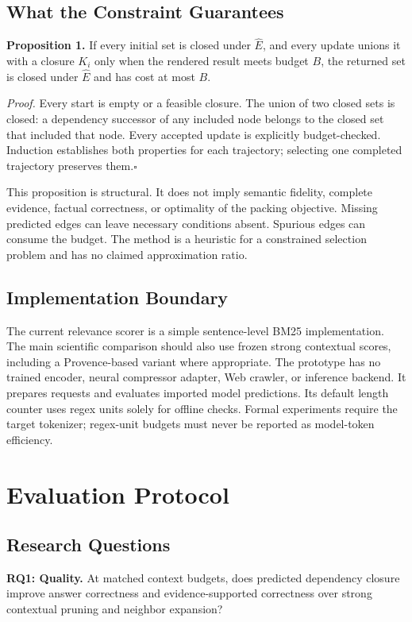 \documentclass[10pt,twocolumn]{article}
\begin{document}
\subsection{What the Constraint Guarantees}
\noindent\textbf{Proposition 1.} If every initial set is closed under $\widehat E$, and every update unions it with a closure $K_i$ only when the rendered result meets budget $B$, the returned set is closed under $\widehat E$ and has cost at most $B$.

\noindent\emph{Proof.} Every start is empty or a feasible closure. The union of two closed sets is closed: a dependency successor of any included node belongs to the closed set that included that node. Every accepted update is explicitly budget-checked. Induction establishes both properties for each trajectory; selecting one completed trajectory preserves them.\hfill$\square$

This proposition is structural. It does not imply semantic fidelity, complete evidence, factual correctness, or optimality of the packing objective. Missing predicted edges can leave necessary conditions absent. Spurious edges can consume the budget. The method is a heuristic for a constrained selection problem and has no claimed approximation ratio.

\subsection{Implementation Boundary}
The current relevance scorer is a simple sentence-level BM25 implementation. The main scientific comparison should also use frozen strong contextual scores, including a Provence-based variant where appropriate. The prototype has no trained encoder, neural compressor adapter, Web crawler, or inference backend. It prepares requests and evaluates imported model predictions. Its default length counter uses regex units solely for offline checks. Formal experiments require the target tokenizer; regex-unit budgets must never be reported as model-token efficiency.

\section{Evaluation Protocol}
\subsection{Research Questions}
\textbf{RQ1: Quality.} At matched context budgets, does predicted dependency closure improve answer correctness and evidence-supported correctness over strong contextual pruning and neighbor expansion?
\end{document}
